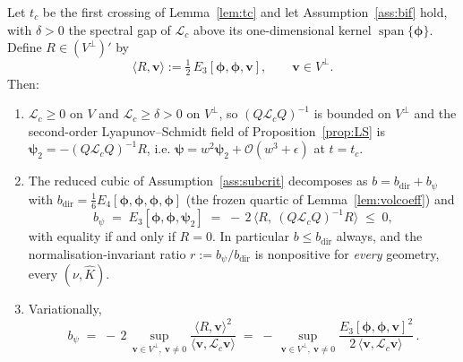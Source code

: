 \begin{lemma}
    \label{lem:fbsign}
    Let $t_c$ be the first crossing of Lemma~\ref{lem:tc} and let Assumption~\ref{ass:bif} hold, with $\delta>0$ the
    spectral gap of $\mathcal{L}_c$ above its one-dimensional kernel $\operatorname{span}\{\bm{\phi}\}$. Define
    $R\in(V^\perp)'$ by
    \begin{equation}
        \label{eq:Rdef}
        \langle R,\bm{v}\rangle := \tfrac12\,E_3[\bm{\phi},\bm{\phi},\bm{v}], \qquad \bm{v}\in V^\perp .
    \end{equation}
    Then:
    \begin{enumerate}
        \item[\textup{(i)}] $\mathcal{L}_c\ge0$ on $V$ and $\mathcal{L}_c\ge\delta>0$ on $V^\perp$, so
              $(Q\mathcal{L}_cQ)^{-1}$ is bounded on $V^\perp$ and the second-order Lyapunov--Schmidt field of
              Proposition~\ref{prop:LS} is $\bm{\psi}_2=-(Q\mathcal{L}_cQ)^{-1}R$, i.e.
              $\bm{\psi}=w^2\bm{\psi}_2+\mathcal{O}(w^3+\epsilon)$ at $t=t_c$.
        \item[\textup{(ii)}] The reduced cubic of Assumption~\ref{ass:subcrit} decomposes as
              $b=b_{\mathrm{dir}}+b_\psi$ with $b_{\mathrm{dir}}=\tfrac16E_4[\bm{\phi},\bm{\phi},\bm{\phi},\bm{\phi}]$
              (the frozen quartic of Lemma~\ref{lem:volcoeff}) and
              \begin{equation}
                  \label{eq:fbsign}
                  b_\psi \;=\; E_3[\bm{\phi},\bm{\phi},\bm{\psi}_2]
                  \;=\; -\,2\,\big\langle R,\ (Q\mathcal{L}_cQ)^{-1}R\big\rangle \;\le\; 0,
              \end{equation}
              with equality if and only if $R=0$. In particular $b\le b_{\mathrm{dir}}$ always, and the
              normalisation-invariant ratio $r:=b_\psi/b_{\mathrm{dir}}$ is nonpositive for \emph{every} geometry,
              every $(\nu,\hat K)$.
        \item[\textup{(iii)}] Variationally,
              \begin{equation}
                  \label{eq:fbvar}
                  b_\psi \;=\; -\,2\,\sup_{\bm{v}\in V^\perp,\ \bm{v}\neq0}
                  \frac{\langle R,\bm{v}\rangle^2}{\langle\bm{v},\mathcal{L}_c\bm{v}\rangle}
                  \;=\; -\,\sup_{\bm{v}\in V^\perp,\ \bm{v}\neq0}
                  \frac{E_3[\bm{\phi},\bm{\phi},\bm{v}]^2}{2\,\langle\bm{v},\mathcal{L}_c\bm{v}\rangle}\,.
              \end{equation}
    \end{enumerate}
\end{lemma}

